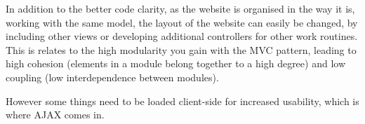 In addition to the better code clarity, as the website is organised in the way it is, working with the same model, the layout of the website can easily be changed, by including other views or developing additional controllers for other work routines.
This is relates to the high modularity you gain with the MVC pattern, leading to high cohesion (elements in a module belong together to a high degree) and low coupling (low interdependence between modules).

However some things need to be loaded client-side for increased usability, which is where AJAX comes in.


